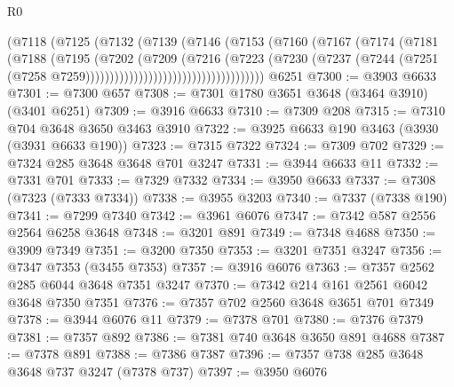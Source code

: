 \begin{lexlean}{R0}
\begin{coremodule}
                                    (@7118
                                      (@7125
                                        (@7132
                                          (@7139
                                            (@7146
                                              (@7153
                                                (@7160
                                                  (@7167
                                                    (@7174
                                                      (@7181
                                                        (@7188
                                                          (@7195
                                                            (@7202
                                                              (@7209
                                                                (@7216
                                                                  (@7223
                                                                    (@7230
                                                                      (@7237
                                                                        (@7244
                                                                          (@7251
                                                                            (@7258
                                                                              @7259)))))))))))))))))))))))))))))))))))))
    @6251
@7300 := @3903 @6633
@7301 := @7300 @657
@7308 := @7301 @1780 @3651 @3648 (@3464 @3910) (@3401 @6251)
@7309 := @3916 @6633
@7310 := @7309 @208
@7315 := @7310 @704 @3648 @3650 @3463 @3910
@7322 := @3925 @6633 @190 @3463 (@3930 (@3931 @6633 @190))
@7323 := @7315 @7322
@7324 := @7309 @702
@7329 := @7324 @285 @3648 @3648 @701 @3247
@7331 := @3944 @6633 @11
@7332 := @7331 @701
@7333 := @7329 @7332
@7334 := @3950 @6633
@7337 := @7308 (@7323 (@7333 @7334))
@7338 := @3955 @3203
@7340 := @7337 (@7338 @190)
@7341 := @7299 @7340
@7342 := @3961 @6076
@7347 := @7342 @587 @2556 @2564 @6258 @3648
@7348 := @3201 @891
@7349 := @7348 @4688
@7350 := @3909 @7349
@7351 := @3200 @7350
@7353 := @3201 @7351 @3247
@7356 := @7347 @7353 (@3455 @7353)
@7357 := @3916 @6076
@7363 := @7357 @2562 @285 @6044 @3648 @7351 @3247
@7370 := @7342 @214 @161 @2561 @6042 @3648 @7350 @7351
@7376 := @7357 @702 @2560 @3648 @3651 @701 @7349
@7378 := @3944 @6076 @11
@7379 := @7378 @701
@7380 := @7376 @7379
@7381 := @7357 @892
@7386 := @7381 @740 @3648 @3650 @891 @4688
@7387 := @7378 @891
@7388 := @7386 @7387
@7396 := @7357 @738 @285 @3648 @3648 @737 @3247 (@7378 @737)
@7397 := @3950 @6076

\end{coremodule}
\end{lexlean}
